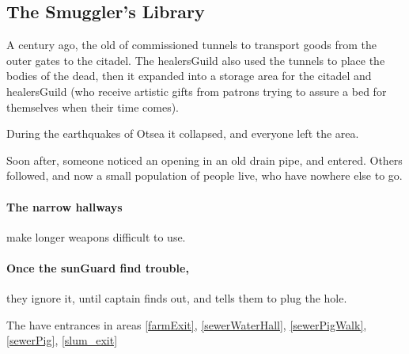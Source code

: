 \subsection[Smuggler's Library]{The Smuggler's Library}
\label{sewers}

A century ago, the old  of  commissioned tunnels to transport goods from the outer gates to the citadel.
The \gls{healersGuild} also used the tunnels to place the bodies of the dead, then it expanded into a storage area for the citadel and \gls{healersGuild} (who receive artistic gifts from patrons trying to assure a bed for themselves when their time comes).

During the earthquakes of Otsea%
it collapsed, and everyone left the area.

Soon after, someone noticed an opening in an old drain pipe, and entered.
Others followed, and now a small population of people live, who have nowhere else to go.

\paragraph{The narrow hallways}
make longer weapons difficult to use.%

\paragraph{Once the \gls{sunGuard} find trouble,}
they ignore it, until \gls{captain} finds out, and tells them to plug the hole.

The  have entrances in areas \ref{farmExit}, \ref{sewerWaterHall}, \ref{sewerPigWalk}, \ref{sewerPig}, \ref{slum_exit}


